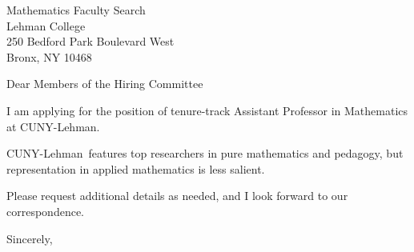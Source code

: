 




	
	
	\def\School{CUNY-Lehman}
	
	\begin{letter}
		{Mathematics Faculty Search\\
			Lehman College \\
			250 Bedford Park Boulevard West\\
			Bronx, NY 10468
		}
		
		\opening{Dear Members of the Hiring Committee}
		
		
		I am applying for the position of tenure-track Assistant Professor in Mathematics at \School. 
		
		
		
		\School~features top researchers in pure mathematics and pedagogy, but representation in applied mathematics is less salient. 
		
		
		
		
		
		Please request additional details as needed, and I look forward to our correspondence.
		
		\closing{Sincerely,}
	\end{letter}
